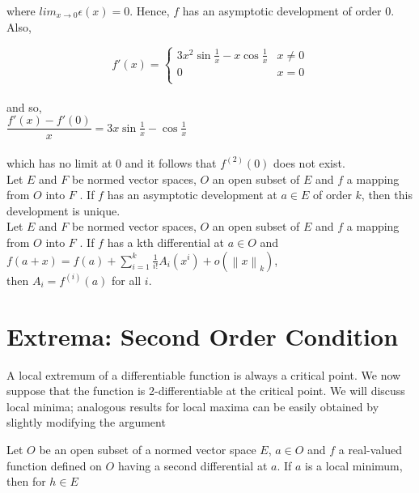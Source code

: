 \documentclass[11 pt]{article}
\theoremstyle{definition}
\theoremstyle{remark}
\newcommand\norm[1]{\left\lVert#1\right\rVert}
\begin{document}
where $lim_{x \to 0} \epsilon (x) = 0$. Hence, $f$ has an asymptotic development of order $0$.\\

Also,

\hspace*{3cm}  \[ f'(x) = \begin{cases} 
							 3x^2 \sin \frac{1}{x} - x \cos \frac{1}{x} & x \neq 0 \\
							 0 & x = 0\\
							 \end{cases}
							 \]\\
			
and so,\\
\hspace*{3cm} $\dfrac{f'(x) - f'(0)}{x} = 3x \sin \frac{1}{x} - \cos \frac{1}{x}$\\~\\
which has no limit at $0$ and it follows that $f^{(2)}(0)$ does not exist.\\

\newpage
\theorem Let $E$ and $F$ be normed vector spaces, $O$ an open subset of $E$ and $f$ a mapping from $O$ into $F$ . If $f$ has an asymptotic development at $a \in E$ of order $k$, then this development is unique.\\


\corollary Let $E$ and $F$ be normed vector spaces, $O$ an open subset of $E$ and $f$ a mapping from  $O$ into $F$ . If $f$ has a kth differential at $a \in O$ and\\

\hspace{3cm} $f(a+x) = f(a) + \sum_{i=1}^k \frac{1}{i!} A_i (x^i) + o(\norm{x}_k)$,\\

then $A_i = f^{(i)} (a)$ for all $i$.\\

\section{Extrema: Second Order Condition}
\normalfont

A local extremum of a differentiable function is always a critical point. We now suppose that the function is 2-differentiable at the critical point. We will discuss local minima; analogous results for local maxima can be easily obtained by slightly modifying the argument

\proposition Let $O$ be an open subset of a normed vector space $E$, $a \in O$ and $f$ a real-valued function defined on $O$ having a second differential at $a$. If $a$ is a local minimum, then for $h \in E$ \\
\end{document}
